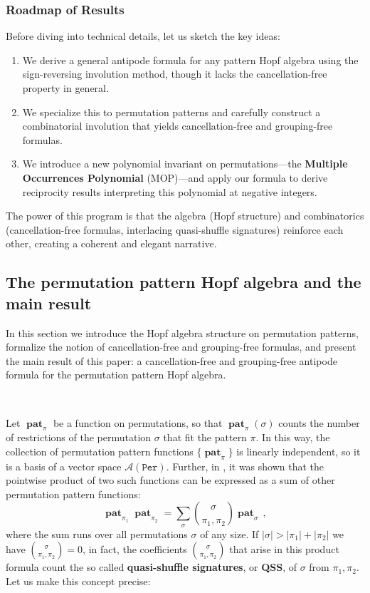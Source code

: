 \documentclass[12pt, reqno]{amsart}
\theoremstyle{definition}
\DeclareMathOperator{\pat}{\mathbf{pat}}
\begin{document}
\subsubsection*{Roadmap of Results}

Before diving into technical details, let us sketch the key ideas:
\begin{enumerate}
\item We derive a general antipode formula for any pattern Hopf algebra using the sign-reversing involution method, though it lacks the cancellation-free property in general.
\item We specialize this to permutation patterns and carefully construct a combinatorial involution that yields cancellation-free and grouping-free formulas.
\item We introduce a new polynomial invariant on permutations---the \textbf{Multiple Occurrences Polynomial} (MOP)---and apply our formula to derive reciprocity results interpreting this polynomial at negative integers.
\end{enumerate}

The power of this program is that the algebra (Hopf structure) and combinatorics (cancellation-free formulas, interlacing quasi-shuffle signatures) reinforce each other, creating a coherent and elegant narrative.

\subsection{The permutation pattern Hopf algebra and the main result}

In this section we introduce the Hopf algebra structure on permutation patterns, formalize the notion of cancellation-free and grouping-free formulas, and present the main result of this paper: a cancellation-free and grouping-free antipode formula for the permutation pattern Hopf algebra.

\

Let $\pat_{\pi}$ be a function on permutations, so that $\pat_{\pi}(\sigma)$ counts the number of restrictions of the permutation $\sigma$ that fit the pattern $\pi$.
In this way, the collection of permutation pattern functions $\{\pat_{\pi}\}$ is linearly independent, so it is a basis of a vector space $\mathcal A (\mathtt{Per})$.
Further, in \cite{Vargas}, it was shown that the pointwise product of two such functions can be expressed as a sum of other permutation pattern functions:
\begin{equation}\label{eq:prodperm}
\pat_{\pi_1} \pat_{\pi_2} = \sum_{\sigma} \binom{\sigma}{\pi_1, \pi_2} \pat_{\sigma} \, ,
\end{equation}
where the sum runs over all permutations $\sigma$ of any size.
If $|\sigma| > |\pi_1| + |\pi_2|$ we have $\binom{\sigma}{\pi_1, \pi_2} = 0$, in fact, the coefficients $\binom{\sigma}{\pi_1, \pi_2}$ that arise in this product formula count the so called \textbf{quasi-shuffle signatures}, or \textbf{QSS}, of $\sigma$ from $\pi_1, \pi_2$.
Let us make this concept precise:
\end{document}
